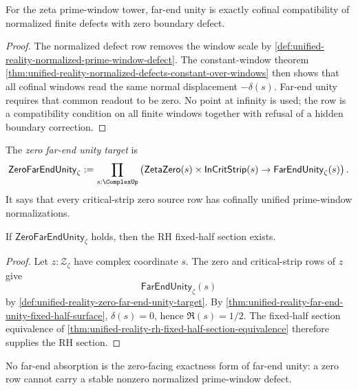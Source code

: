 \begin{theorem}
\label{thm:unified-reality-far-end-unity-cofinal-compatibility}
For the zeta prime-window tower, far-end unity is exactly cofinal
compatibility of normalized finite defects with zero boundary defect.
\end{theorem}

\begin{proof}
The normalized defect row removes the window scale by
\autoref{def:unified-reality-normalized-prime-window-defect}.  The
constant-window theorem
\autoref{thm:unified-reality-normalized-defects-constant-over-windows}
then shows that all cofinal windows read the same normal displacement
$-\delta(s)$.  Far-end unity requires that common readout to be zero.
No point at infinity is used; the row is a compatibility condition on
all finite windows together with refusal of a hidden boundary correction.
\end{proof}

\begin{definition}
\label{def:unified-reality-zero-far-end-unity-target}
The \emph{zero far-end unity target} is
$$
\mathsf{ZeroFarEndUnity}_{\zeta}
:=
\prod_{s:\ComplexUp}
\left(
\mathsf{ZetaZero}(s)
\times
\mathsf{InCritStrip}(s)
\to
\mathsf{FarEndUnity}_{\zeta}(s)
\right).
$$
It says that every critical-strip zero source row has cofinally unified
prime-window normalizations.
\end{definition}

\begin{theorem}
\label{thm:unified-reality-zero-far-end-unity-implies-rh-section}
If $\mathsf{ZeroFarEndUnity}_{\zeta}$ holds, then the RH fixed-half
section exists.
\end{theorem}

\begin{proof}
Let $z:\mathcal Z_{\zeta}$ have complex coordinate $s$.  The zero and
critical-strip rows of $z$ give
$$
\mathsf{FarEndUnity}_{\zeta}(s)
$$
by \autoref{def:unified-reality-zero-far-end-unity-target}.  By
\autoref{thm:unified-reality-far-end-unity-fixed-half-surface},
$\delta(s)=0$, hence $\Re(s)=1/2$.  The fixed-half section equivalence
of \autoref{thm:unified-reality-rh-fixed-half-section-equivalence}
therefore supplies the RH section.
\end{proof}

\begin{theorem}
\label{thm:unified-reality-no-far-end-absorption-zero-facing-exactness}
No far-end absorption is the zero-facing exactness form of far-end unity:
a zero row cannot carry a stable nonzero normalized prime-window defect.
\end{theorem}

